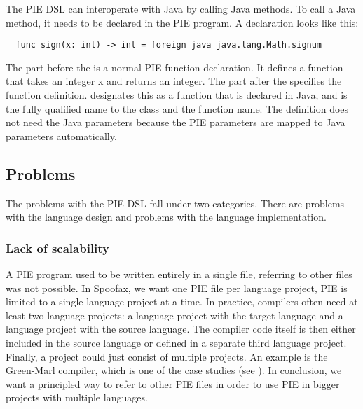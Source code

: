 The \ac{PIE} \ac{DSL} can interoperate with Java by calling Java methods.
To call a Java method, it needs to be declared in the \ac{PIE} program.
A declaration looks like this:
\begin{lstlisting}
  func sign(x: int) -> int = foreign java java.lang.Math.signum
\end{lstlisting}
The part before the \inlinecode{=} is a normal \ac{PIE} function declaration.
It defines a function  that takes an integer x and returns an integer.
The part after the \inlinecode{=} specifies the function definition.
 designates this as a function that is declared in Java, and  is the fully qualified name to the class and the function name.
The definition does not need the Java parameters because the \ac{PIE} parameters are mapped to Java parameters automatically.

\subsection{Problems}
\label{subsec:problem_analysis__problems}

The problems with the \ac{PIE} \ac{DSL} fall under two categories.
There are problems with the language design and problems with the language implementation.

\subsubsection{Lack of scalability}
\label{subsubsec:problem_analysis__problems__scalability}

A \ac{PIE} program used to be written entirely in a single file, referring to other files was not possible.
In Spoofax, we want one \ac{PIE} file per language project, \ac{PIE} is limited to a single language project at a time.
In practice, compilers often need at least two language projects: a language project with the target language and a language project with the source language.
The compiler code itself is then either included in the source language or defined in a separate third language project.
Finally, a project could just consist of multiple projects.
An example is the Green-Marl compiler, which is one of the case studies (see ).
In conclusion, we want a principled way to refer to other \ac{PIE} files in order to use \ac{PIE} in bigger projects with multiple languages.

